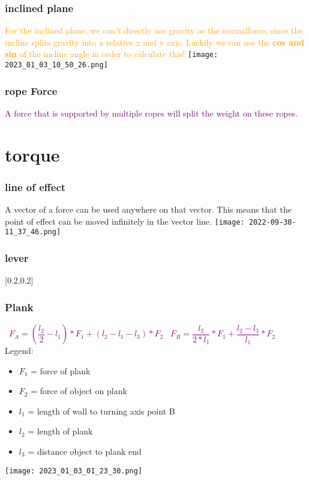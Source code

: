 \documentclass[main.tex,fontsize=8pt,paper=a4,paper=portrait,DIV=calc,]{scrartcl}
\begin{document}
\begin{multicols*}{2}
\subsubsection{inclined plane}
\textcolor{orange}{For the inclined plane, we can't directly use gravity as the normalforce, since the incline splits gravity into a relative x and y axis. 
Luckily we can use the \textbf{cos and sin} of the incline angle in order to calculate this!}\newline
\texttt{[image: 2023\_01\_03\_10\_50\_26.png]}

\subsubsection{rope Force}
\textcolor{purple}{A force that is supported by multiple ropes will split the weight on these ropes.}

\section{torque}
\subsubsection{line of effect}
A vector of a force can be used anywhere on that vector.\newline
This means that the point of effect can be moved infinitely in the vector line.\newline
\texttt{[image: 2022-09-30-11\_37\_46.png]}

\subsubsection{lever} 
[0.2,0.2]

\subsubsection{Plank}
\, \newline
\large \textcolor{purple}{\( F_A =\left(\dfrac{l_2}{2}-l_1\right) * F_1 + \left( l_2-l_1-l_3 \right) * F_2\)}\newline
\, \newline
\large \textcolor{purple}{\( F_B = \dfrac{l_2}{2*l_1} * F_1 + \dfrac{l_2 - l_3}{l_1} * F_2 \)}
\, \newline
\normalsize Legend: \newline
\begin{itemize}
\item \(F_1\) = force of plank
\item \(F_2\) = force of object on plank
\item \(l_1\) = length of wall to turning axis point B 
\item \(l_2\) = length of plank
\item \(l_3\) = distance object to plank end 
\end{itemize} 
\texttt{[image: 2023\_01\_03\_01\_23\_30.png]}


\end{multicols*}
\end{document}
